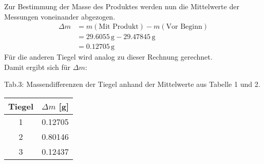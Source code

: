 \documentclass[12pt]{scrartcl} %
\begin{document}
Zur Bestimmung der Masse des Produktes werden nun die Mittelwerte der Messungen voneinander abgezogen.\\
\begin{align*}
  \Delta m &= m(\text{Mit Produkt}) - m(\text{Vor Beginn})\\
  &= 29.6055\,\mathrm{g} - 29.47845\,\mathrm{g}\\
  &= 0.12705\,\mathrm{g}
\end{align*}
Für die anderen Tiegel wird analog zu dieser Rechnung gerechnet.\\
Damit ergibt sich für $\Delta m$:\\
\begin{center}
  Tab.3: Massendifferenzen der Tiegel anhand der Mittelwerte aus Tabelle 1 und 2.\\
  \begin{tabular}{c c}
    \hline
    Tiegel&$\Delta m$ [g]\\
    \hline
    1&0.12705\\
    2&0.80146\\
    3&0.12437\\
    \hline
  \end{tabular}
\end{center}
\end{document}
